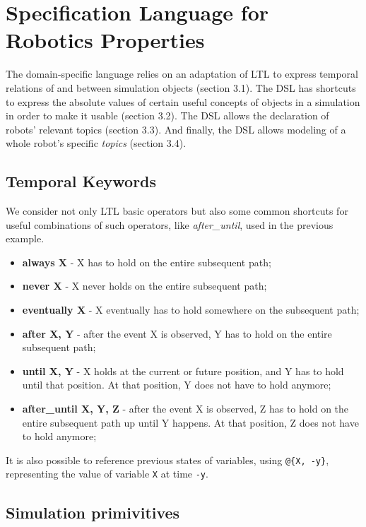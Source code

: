 \documentclass[runningheads]{llncs}
\begin{document}
\section{Specification Language for Robotics Properties}

The domain-specific language relies on an adaptation of LTL to express temporal relations of and between simulation objects (section 3.1). The DSL has shortcuts to express the absolute values of certain useful concepts of objects in a simulation in order to make it usable (section 3.2). The DSL allows the declaration of robots' relevant topics (section 3.3). And finally, the DSL allows modeling of a whole robot's specific \textit{topics} (section 3.4).

\subsection{Temporal Keywords}

We consider not only LTL basic operators but also some common shortcuts for useful combinations of such operators, like \textit{after\_until}, used in the previous example.

\begin{itemize}
\item {\bfseries always X} - X has to hold on the entire subsequent path;
\item {\bfseries never X} - X never holds on the entire subsequent path;
\item {\bfseries eventually X} - X eventually has to hold somewhere on the subsequent path;
\item {\bfseries after X, Y} - after the event X is observed, Y has to hold on the entire subsequent path;
\item {\bfseries until X, Y} - X holds at the current or future position, and Y has to hold until that position. At that position, Y does not have to hold anymore;
\item {\bfseries after\_until X, Y, Z} - after the event X is observed, Z has to hold on the entire subsequent path up until Y happens. At that position, Z does not have to hold anymore;
\end{itemize}

\noindent It is also possible to reference previous states of variables, using \lstinline|@{X, -y}|, representing the value of variable \lstinline|X| at time \lstinline|-y|.

\subsection{Simulation primivitives}
\end{document}
